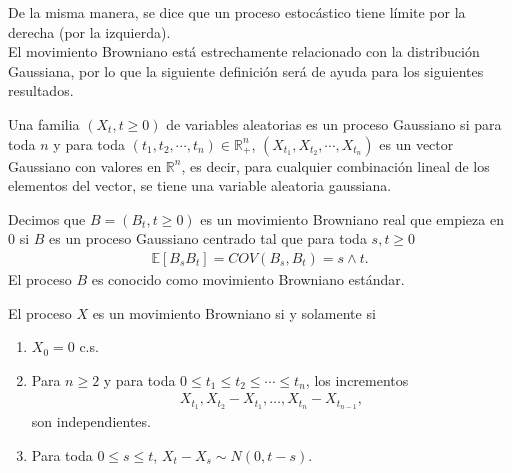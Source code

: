 De la misma manera, se dice que un proceso estocástico tiene límite por la derecha (por la izquierda). \\

El movimiento Browniano está estrechamente relacionado con la distribución Gaussiana, por lo que la siguiente definición será de ayuda para los siguientes resultados.

\begin{definition}
Una familia $(X_t, t \geq 0)$ de variables aleatorias es un proceso Gaussiano si para toda $n$ y para toda $(t_1, t_2, \cdots, t_n) \in \mathbb{R}_{+}^{n}$, $(X_{t_1}, X_{t_2}, \cdots, X_{t_n})$ es un vector Gaussiano con valores en $\mathbb{R}^n$, es decir, para cualquier combinación lineal de los elementos del vector, se tiene una variable aleatoria gaussiana.
\end{definition}

\begin{definition}
Decimos que $B = (B_t, t \geq 0)$ es un movimiento Browniano real que empieza en 0 si $B$ es un proceso Gaussiano centrado tal que para toda $s, t \geq 0$
\begin{align}
\mathbb{E}[B_s B_t] = COV(B_s, B_t) = s \wedge t.
\end{align}
El proceso $B$ es conocido como movimiento Browniano estándar.
\end{definition}

\begin{proposition}
El proceso $X$ es un movimiento Browniano si y solamente si
\begin{enumerate}
\item $X_0 = 0$ c.s.
\item Para $n \geq 2$ y para toda $0 \leq t_1 \leq t_2 \leq \cdots \leq t_n$, los incrementos
  \begin{align*}
  	X_{t_1}, X_{t_2} - X_{t_1}, \ldots, X_{t_n} - X_{t_{n-1}},
  \end{align*}
son independientes.
\item Para toda $0 \leq s \leq t$, $X_t - X_s \sim N(0, t - s)$.
\end{enumerate}
\end{proposition}

